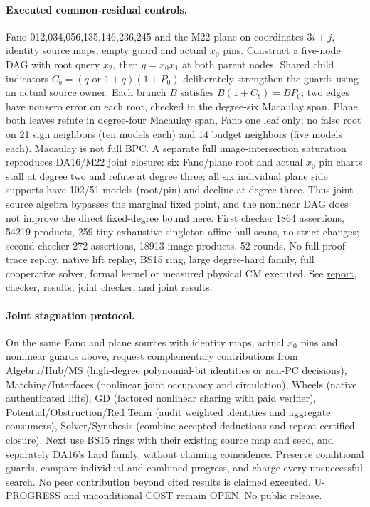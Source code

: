 \documentclass[11pt]{article}
\begin{document}
\paragraph{Executed common-residual controls.}
Fano 012,034,056,135,146,236,245 and the M22 plane on coordinates $3i+j$, identity source maps, empty guard and actual $x_0$ pins. Construct a five-node DAG with root query $x_2$, then $q=x_0x_1$ at both parent nodes. Shared child indicators $C_b=(q\text{ or }1+q)(1+P_0)$ deliberately strengthen the guards using an actual source owner. Each branch $B$ satisfies $B(1+C_b)=BP_0$; two edges have nonzero error on each root, checked in the degree-six Macaulay span. Plane both leaves refute in degree-four Macaulay span, Fano one leaf only; no false root on 21 sign neighbors (ten models each) and 14 budget neighbors (five models each). Macaulay is not full BPC. A separate full image-intersection saturation reproduces DA16/M22 joint closure: six Fano/plane root and actual $x_0$ pin charts stall at degree two and refute at degree three; all six individual plane side supports have 102/51 models (root/pin) and decline at degree three. Thus joint source algebra bypasses the marginal fixed point, and the nonlinear DAG does not improve the direct fixed-degree bound here. First checker 1864 assertions, 54219 products, 259 tiny exhaustive singleton affine-hull scans, no strict changes; second checker 272 assertions, 18913 image products, 52 rounds. No full proof trace replay, native lift replay, BS15 ring, large degree-hard family, full cooperative solver, formal kernel or measured physical CM executed. See \href{https://github.com/j15marti/pnp/commit/8a7274ad8c72b83074f27809ed96590a6fb3965e}{report}, \href{https://github.com/j15marti/pnp/commit/70b5098f6a75cefccad980cba58558b3b649b6aa}{checker}, \href{https://github.com/j15marti/pnp/commit/01a01b6f6e3689c905b1d83e2f688ba03f267273}{results}, \href{https://github.com/j15marti/pnp/commit/ec17725f3e029ea1c65c8ca7d137d1ce708930eb}{joint checker}, and \href{https://github.com/j15marti/pnp/commit/e6aa8b8cbd8fa4199c8b069f884a4de9453c07f6}{joint results}.

\paragraph{Joint stagnation protocol.}
On the same Fano and plane sources with identity maps, actual $x_0$ pins and nonlinear guards above, request complementary contributions from Algebra/Hub/MS (high-degree polynomial-bit identities or non-PC decisions), Matching/Interfaces (nonlinear joint occupancy and circulation), Wheels (native authenticated lifts), GD (factored nonlinear sharing with paid verifier), Potential/Obstruction/Red Team (audit weighted identities and aggregate consumers), Solver/Synthesis (combine accepted deductions and repeat certified closure). Next use BS15 rings with their existing source map and seed, and separately DA16's hard family, without claiming coincidence. Preserve conditional guards, compare individual and combined progress, and charge every unsuccessful search. No peer contribution beyond cited results is claimed executed. U-PROGRESS and unconditional COST remain OPEN. No public release.
\end{document}
